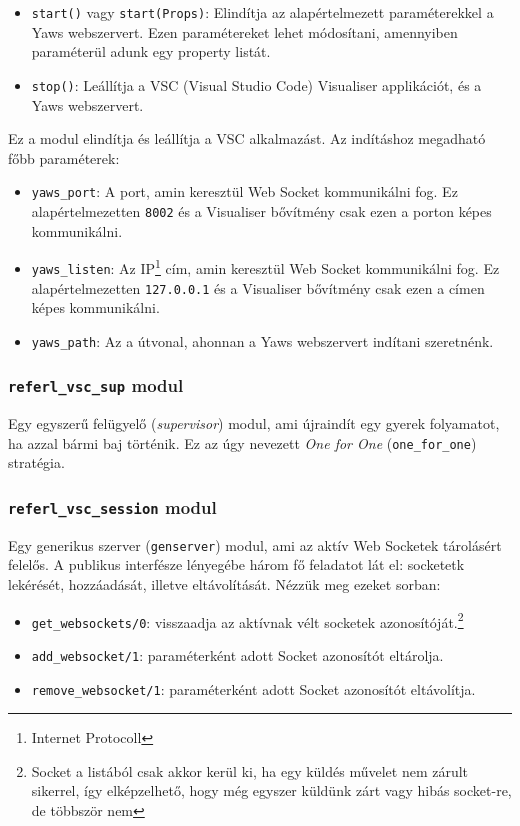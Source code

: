 \begin{itemize}
    \item \lstinline{start()} vagy \lstinline{start(Props)}: Elindítja az alapértelmezett paraméterekkel a Yaws webszervert. Ezen paramétereket lehet módosítani, amennyiben paraméterül adunk egy property listát.
    \item \lstinline{stop()}: Leállítja a VSC (Visual Studio Code) Visualiser applikációt, és a Yaws webszervert.
\end{itemize}
 
Ez a modul elindítja és leállítja a VSC alkalmazást. Az indításhoz megadható főbb paraméterek:

\begin{itemize}
    \item \lstinline{yaws_port}: A port, amin keresztül Web Socket kommunikálni fog. Ez alapértelmezetten \lstinline{8002} és a Visualiser bővítmény csak ezen a porton képes kommunikálni.
    \item \lstinline{yaws_listen}: Az IP\footnote{Internet Protocoll} cím, amin keresztül Web Socket kommunikálni fog. Ez alapértelmezetten \lstinline{127.0.0.1} és a Visualiser bővítmény csak ezen a címen képes kommunikálni.
    \item \lstinline{yaws_path}: Az a útvonal, ahonnan a Yaws webszervert indítani szeretnénk. 

\end{itemize}

\subsubsection{\lstinline{referl_vsc_sup} modul}

Egy egyszerű felügyelő (\textit{supervisor}) modul, ami újraindít egy gyerek folyamatot, ha azzal bármi baj történik. Ez az úgy nevezett \textit{One for One} (\lstinline{one_for_one}) stratégia. 

\subsubsection{\lstinline{referl_vsc_session} modul}

Egy generikus szerver (\lstinline{genserver}) modul, ami az aktív Web Socketek tárolásért 
felelős. A publikus interfésze lényegébe három fő feladatot lát el: socketetk lekérését, hozzáadását, illetve eltávolítását. Nézzük meg ezeket sorban:

\begin{itemize}
    \item \lstinline{get_websockets/0}: visszaadja az aktívnak vélt socketek azonosítóját.\footnote{Socket a listából csak akkor kerül ki, ha egy küldés művelet nem zárult sikerrel, így elképzelhető, hogy még egyszer küldünk zárt vagy hibás socket-re, de többször nem}
    \item \lstinline{add_websocket/1}: paraméterként adott Socket azonosítót eltárolja.
    \item \lstinline{remove_websocket/1}: paraméterként adott Socket azonosítót eltávolítja.
\end{itemize}



